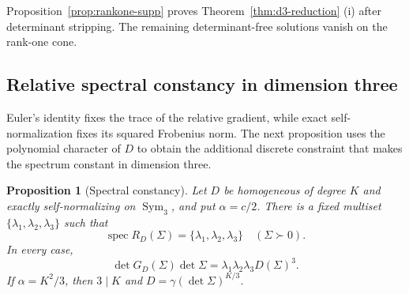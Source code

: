 \documentclass[12pt,a4paper]{article}
\theoremstyle{plain}
\newtheorem{proposition}{Proposition}
\theoremstyle{definition}
\newcommand{\Sym}{\operatorname{Sym}}
\newcommand{\spec}{\operatorname{spec}}
\begin{document}
Proposition~\ref{prop:rankone-supp} proves Theorem~\ref{thm:d3-reduction} (i) after determinant stripping.
The remaining determinant-free solutions vanish on the rank-one cone.

\subsection{Relative spectral constancy in dimension three}
\label{supp:d3-spectral-constancy}

Euler's identity fixes the trace of the relative gradient, while exact self-normalization fixes its squared Frobenius norm.
The next proposition uses the polynomial character of $D$ to obtain the additional discrete constraint that makes the spectrum constant in dimension three.

\begin{proposition}[Spectral constancy]
\label{prop:spectrum-supp}
    Let $D$ be homogeneous of degree $K$ and exactly self-normalizing on $\Sym_3$, and put $\alpha=c/2$.
    There is a fixed multiset $\{\lambda_1,\lambda_2,\lambda_3\}$ such that
    \begin{equation*}
        \spec R_D(\Sigma)
        =
        \{\lambda_1,\lambda_2,\lambda_3\}
        \quad
        (\Sigma\succ0)
        .
    \end{equation*}
    In every case,
    \begin{equation*}
        \det G_D(\Sigma)\det\Sigma
        =
        \lambda_1\lambda_2\lambda_3D(\Sigma)^3
        .
    \end{equation*}
    If $\alpha=K^2/3$, then $3\mid K$ and $D=\gamma(\det\Sigma)^{K/3}$.
\end{proposition}
\end{document}
